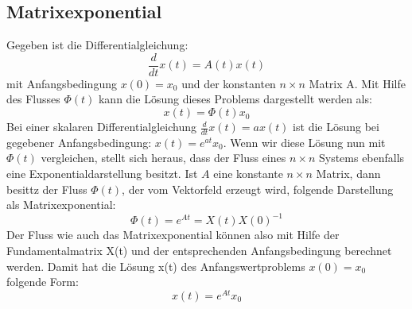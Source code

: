 
\subsection{Matrixexponential}
Gegeben ist die Differentialgleichung:
\begin{equation*}
\frac{d}{dt}x(t) = A(t)x(t)
\end{equation*}
mit Anfangsbedingung $x(0) = x_0$ und der konstanten $n \times n$ Matrix A. Mit Hilfe des Flusses $\Phi(t)$ kann die Lösung dieses Problems dargestellt werden als: 
\begin{equation*}
x(t) = \Phi(t)x_0
\end{equation*}
Bei einer skalaren Differentialgleichung $\frac{d}{dt}x(t) = ax(t)$ ist die Lösung bei gegebener Anfangsbedingung: $x(t) = e^{at}x_0$. Wenn wir diese Lösung nun mit $\Phi(t)$ vergleichen, stellt sich heraus, dass der Fluss eines $n \times n$ Systems ebenfalls eine Exponentialdarstellung besitzt. 
Ist $A$ eine konstante $n \times n$ Matrix, dann besittz der Fluss $\Phi(t)$, der vom Vektorfeld erzeugt wird, folgende Darstellung als Matrixexponential: 
\begin{equation*}
\Phi(t) = e^{At} = X(t)X(0)^{-1}
\end{equation*}
Der Fluss wie auch das Matrixexponential können also mit Hilfe der Fundamentalmatrix X(t) und der entsprechenden Anfangsbedingung berechnet werden.
Damit hat die Lösung x(t) des Anfangswertproblems $x(0) = x_0$ folgende Form: 
\begin{equation*}
x(t) = e^{At}x_0
\end{equation*}


